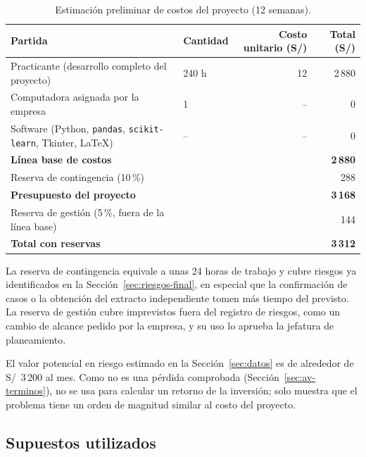 \begin{table}[htbp]
\centering
\caption{Estimación preliminar de costos del proyecto (12 semanas).}
\label{tab:presupuesto}
\small
\begin{tabularx}{\textwidth}{@{}YL{2.2cm}rr@{}}
\toprule
\textbf{Partida} & \textbf{Cantidad} & \textbf{Costo unitario (S/)} & \textbf{Total (S/)} \\
\midrule
Practicante (desarrollo completo del proyecto) & 240 h & 12 & 2\,880 \\
Computadora asignada por la empresa & 1 & -- & 0 \\
Software (Python, \texttt{pandas}, \texttt{scikit-learn}, Tkinter, \LaTeX) & -- & -- & 0 \\
\midrule
\textbf{Línea base de costos} & & & \textbf{2\,880} \\
Reserva de contingencia (10\,\%) & & & 288 \\
\midrule
\textbf{Presupuesto del proyecto} & & & \textbf{3\,168} \\
Reserva de gestión (5\,\%, fuera de la línea base) & & & 144 \\
\midrule
\textbf{Total con reservas} & & & \textbf{3\,312} \\
\bottomrule
\end{tabularx}
\end{table}

La reserva de contingencia equivale a unas 24 horas de trabajo y cubre riesgos ya identificados en la Sección~\ref{sec:riesgos-final}, en especial que la confirmación de casos o la obtención del extracto independiente tomen más tiempo del previsto. La reserva de gestión cubre imprevistos fuera del registro de riesgos, como un cambio de alcance pedido por la empresa, y su uso lo aprueba la jefatura de planeamiento.

El valor potencial en riesgo estimado en la Sección~\ref{sec:datos} es de alrededor de S/~3\,200 al mes. Como no es una pérdida comprobada (Sección~\ref{sec:av-terminos}), no se usa para calcular un retorno de la inversión; solo muestra que el problema tiene un orden de magnitud similar al costo del proyecto.

\subsection{Supuestos utilizados}

